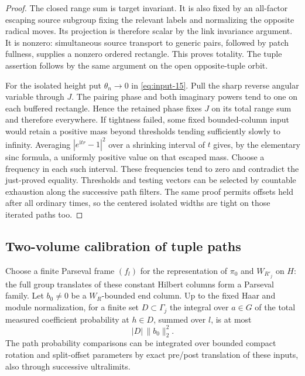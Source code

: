 \begin{proof}
The closed range sum is target invariant.  It is also fixed by an
all-factor escaping source subgroup fixing the relevant labels and
normalizing the opposite radical moves.  Its projection is therefore
scalar by the link invariance argument.  It is nonzero: simultaneous source
transport to generic pairs, followed by patch fullness, supplies a nonzero
ordered rectangle.  This proves totality.  The tuple assertion follows by
the same argument on the open opposite-tuple orbit.

For the isolated height put $\theta_n\to0$ in
\eqref{eq:input-15}.  Pull the sharp reverse angular variable through $J$.
The pairing phase and both imaginary powers tend to one on each buffered
rectangle.  Hence the retained phase fixes $J$ on its total range sum and
therefore everywhere.  If tightness failed, some fixed bounded-column input
would retain a positive mass beyond thresholds tending sufficiently slowly
to infinity.  Averaging
$|e^{\mathrm it r}-1|^2$ over a shrinking interval of $t$ gives, by the
elementary sinc formula, a uniformly positive value on that escaped mass.
Choose a frequency in each such interval.  These frequencies tend to zero
and contradict the just-proved equality.  Thresholds and testing vectors
can be selected by countable exhaustion along the successive path
filters.  The same proof permits offsets held after all ordinary times,
so the centered isolated widths are tight on those iterated paths too.
\end{proof}

\subsection{Two-volume calibration of tuple paths}

\begin{lemma}\label{lem:heights-coefficient-integral}
Choose a finite Parseval frame $(f_l)$ for the representation of
$\pi_0$ and $W_{R'_j}$ on $H$: the full group translates of these constant
Hilbert columns form a Parseval family.  Let $b_0\ne0$ be a
$W_R$-bounded end column.  Up to the fixed Haar and module normalization,
for a finite set $D\subset\Gamma_j$ the integral over $a\in G$ of the
total measured coefficient probability at $h\in D$, summed over $l$, is
at most
\[
 |D|\,\|b_0\|_2^2.
\]
The path probability comparisons can be integrated over bounded compact
rotation and split-offset parameters by exact pre/post translation of
these inputs, also through successive ultralimits.
\end{lemma}


